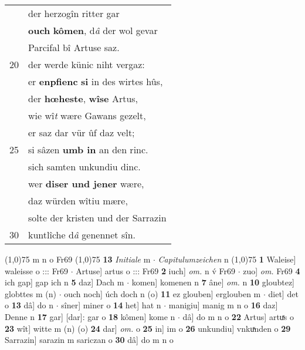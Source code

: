 \documentclass[8pt,a4paper,notitlepage]{article}
\begin{document}
\begin{table}[ht]
\begin{minipage}[t]{0.5\linewidth}
\begin{tabular}{rl}
 & der herzogîn ritter gar\\ 
 & \textbf{ouch} \textbf{kômen}, d\textit{â} der wol gevar\\ 
 & Parcifal bî Artuse saz.\\ 
20 & der werde künic niht vergaz:\\ 
 & er \textbf{enpfienc} \textbf{si} in des wirtes hûs,\\ 
 & der \textbf{hœheste}, \textbf{wîse} Artus,\\ 
 & wie wî\textit{t} wære Gawans gezelt,\\ 
 & er saz dar vür ûf daz velt;\\ 
25 & si sâzen \textbf{umb in} an den rinc.\\ 
 & sich samten unkundiu dinc.\\ 
 & wer \textbf{diser und jener} wære,\\ 
 & daz würden wîtiu mære,\\ 
 & solte der kristen und der Sarrazin\\ 
30 & kuntlîche d\textit{â} genennet sîn.\\ 
\end{tabular}
\scriptsize
\line(1,0){75} \newline
m n o Fr69 \newline
\line(1,0){75} \newline
\textbf{13} \textit{Initiale} m   $\cdot$ \textit{Capitulumzeichen} n  \newline
\line(1,0){75} \newline
\textbf{1} Waleise] waleisse o ::: Fr69  $\cdot$ Artuse] artus o ::: Fr69 \textbf{2} iuch] \textit{om.} n v́ Fr69  $\cdot$ zuo] \textit{om.} Fr69 \textbf{4} ich gap] gap ich n \textbf{5} daz] Dach m  $\cdot$ komen] komenen n \textbf{7} âne] \textit{om.} n \textbf{10} gloubtez] globttes m (n)  $\cdot$ ouch noch] úch doch n (o) \textbf{11} ez glouben] erglouben m  $\cdot$ diet] det o \textbf{13} dâ] do n  $\cdot$ sîner] miner o \textbf{14} het] hat n  $\cdot$ manigiu] manig m n o \textbf{16} daz] Denne n \textbf{17} gar] [dar]: gar o \textbf{18} kômen] kome n  $\cdot$ dâ] do m n o \textbf{22} Artus] artuͯs o \textbf{23} wît] witte m (n) (o) \textbf{24} dar] \textit{om.} o \textbf{25} in] im o \textbf{26} unkundiu] vnkuͯnden o \textbf{29} Sarrazin] sarazin m sariczan o \textbf{30} dâ] do m n o \newline
\end{minipage}
\end{table}
\newpage
\end{document}

